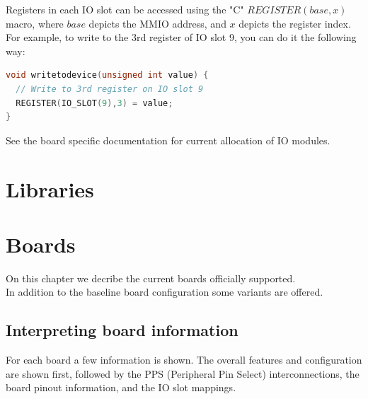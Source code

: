 \documentclass[12pt,a4paper,openany,smallheadings,headinclude,headsepline,final]{scrreprt}
\begin{document}
Registers in each IO slot can be accessed using the "C" $REGISTER(base,x)$ macro, 
where $base$ depicts the MMIO address, and $x$ depicts the register index.\\

For example, to write to the 3rd register of IO slot 9, you can do it the following way:
\begin{lstlisting}[language=C++]
void writetodevice(unsigned int value) {
  // Write to 3rd register on IO slot 9 
  REGISTER(IO_SLOT(9),3) = value;
}
\end{lstlisting}

See the board specific documentation for current allocation of IO modules.










\chapter{Libraries}


\chapter{Boards}
On this chapter we decribe the current boards officially supported. \\
In addition to the baseline board configuration some variants are offered.
\section{Interpreting board information}
For each board a few information is shown. The overall features and configuration are shown first, followed by the PPS (Peripheral 
Pin Select) interconnections, the board pinout information, and the IO slot mappings.\\
\end{document}
